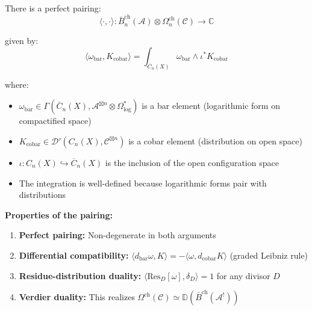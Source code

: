 \begin{theorem}\label{thm:bar-cobar-verdier}
There is a perfect pairing:
$$\langle \cdot, \cdot \rangle: \bar{B}^{\text{ch}}_n(\mathcal{A}) \otimes 
\Omega^{\text{ch}}_n(\mathcal{C}) \to \mathbb{C}$$

given by:
$$\langle \omega_{\text{bar}}, K_{\text{cobar}} \rangle = \int_{\overline{C}_n(X)} 
\omega_{\text{bar}} \wedge \iota^* K_{\text{cobar}}$$

where:
\begin{itemize}
\item $\omega_{\text{bar}} \in \Gamma(\overline{C}_n(X), \mathcal{A}^{\boxtimes n} 
\otimes \Omega^*_{\log})$ is a bar element (logarithmic form on compactified space)
\item $K_{\text{cobar}} \in \mathcal{D}'(C_n(X), \mathcal{C}^{\boxtimes n})$ is 
a cobar element (distribution on open space)
\item $\iota: C_n(X) \hookrightarrow \overline{C}_n(X)$ is the inclusion of the 
open configuration space
\item The integration is well-defined because logarithmic forms pair with distributions
\end{itemize}

\textbf{Properties of the pairing:}
\begin{enumerate}
\item \textbf{Perfect pairing:} Non-degenerate in both arguments
\item \textbf{Differential compatibility:} $\langle d_{\text{bar}}\omega, K \rangle 
= -\langle \omega, d_{\text{cobar}}K \rangle$ (graded Leibniz rule)
\item \textbf{Residue-distribution duality:} $\langle \text{Res}_{D}[\omega], 
\delta_D \rangle = 1$ for any divisor $D$
\item \textbf{Verdier duality:} This realizes $\Omega^{\text{ch}}(\mathcal{C}) 
\simeq \mathbb{D}(\bar{B}^{\text{ch}}(\mathcal{A}^!))$
\end{enumerate}
\end{theorem}

